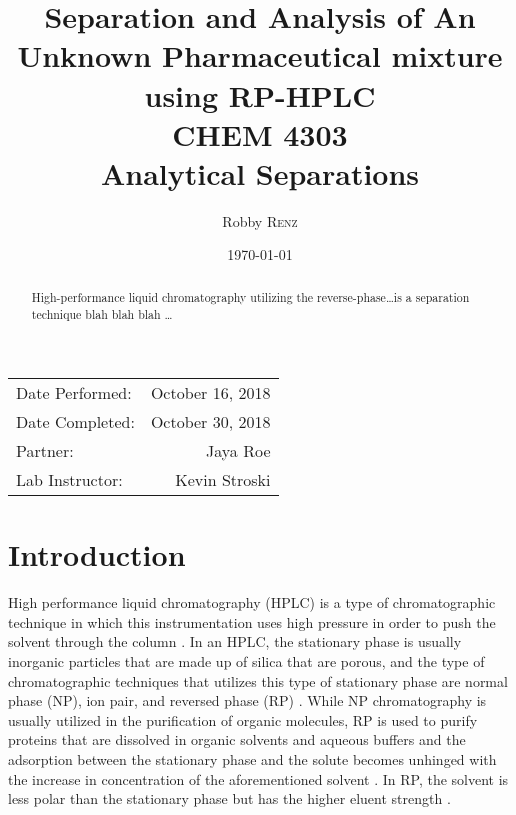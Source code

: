 \documentclass[a4paper, 12pt]{article}
\title{Separation and Analysis of An Unknown Pharmaceutical mixture using RP-HPLC \\ CHEM 4303 \\ Analytical Separations} %
\author{Robby \textsc{Renz}} %
\date{\today} %
\begin{document}
\maketitle %

\begin{center}
\begin{tabular}{l r}
Date Performed: & October 16, 2018 \\ %
Date Completed: & October 30, 2018 \\
Partner: & Jaya Roe \\ %
Lab Instructor: & Kevin Stroski %
\end{tabular}
\end{center}


\begin{abstract}
	High-performance liquid chromatography utilizing the reverse-phase\dots{}is a separation technique blah blah blah \dots
\end{abstract}
\newpage


\section{Introduction}
High performance liquid chromatography (HPLC) is a type of chromatographic technique in which this instrumentation uses high pressure in order to push the solvent through the column \cite{harris}. In an HPLC, the stationary phase is usually inorganic particles that are made up of silica that are porous, and the type of chromatographic techniques that utilizes this type of stationary phase are normal phase (NP), ion pair, and reversed phase (RP) \cite{mold}. While NP chromatography is usually utilized in the purification of organic molecules, RP is used to purify proteins that are dissolved in organic solvents and aqueous buffers and the adsorption between the stationary phase and the solute becomes unhinged with the increase in concentration of the aforementioned solvent \cite{prep_hplc}. In RP, the solvent is less polar than the stationary phase but has the higher eluent strength \cite{harris}. 
\end{document}
